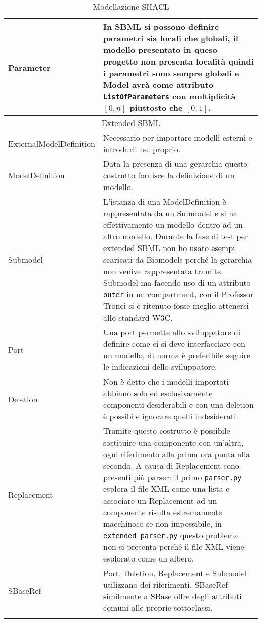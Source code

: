 \documentclass{article}
\begin{document}
\begin{longtable}{p{}p{}}
    \hline
    Parameter & In SBML si possono definire parametri sia locali che globali, il modello presentato in queso progetto non presenta località quindi i parametri sono sempre globali e Model avrà come attributo \texttt{ListOfParameters} con moltiplicità $[0,n]$ piuttosto che $[0,1]$. \\  
    \hline 
    \multicolumn{2}{c}{Extended SBML} \\
    \hline
    ExternalModelDefinition &  Necessario per importare modelli esterni e introdurli nel proprio. \\
    \hline
    ModelDefinition & Data la presenza di una gerarchia questo costrutto fornisce la definizione di un modello. \\ 
    \hline
    Submodel & L'istanza di una ModelDefinition è rappresentata da un Submodel e si ha effettivamente un modello dentro ad un altro modello. Durante la fase di test per extended SBML non ho usato esempi scaricati da Biomodels perché la gerarchia non veniva rappresentata tramite Submodel ma facendo uso di un attributo \texttt{outer} in un compartment, con il Professor Tronci si è ritenuto fosse meglio attenersi allo standard W3C. \\ 
    \hline
    Port & Una port permette allo sviluppatore di definire come ci si deve interfacciare con un modello, di norma è preferibile seguire le indicazioni dello sviluppatore. \\ 
    \hline
    Deletion & Non è detto che i modelli importati abbiano solo ed esclusivamente componenti desiderabili e con una deletion è possibile ignorare quelli indesiderati. \\
    \hline
    Replacement & Tramite questo costrutto è possibile sostituire una componente con un'altra, ogni riferimento alla prima ora punta alla seconda. A causa di Replacement sono presenti più parser: il primo \texttt{parser.py} esplora il file XML come una lista e associare un Replacement ad un componente risulta estremamente macchinoso se non impossibile, in \texttt{extended\_parser.py} questo problema non si presenta perché il file XML viene esplorato come un albero. \\
    \hline
    SBaseRef & Port, Deletion, Replacement e Submodel utilizzano dei riferimenti, SBaseRef similmente a SBase offre degli attributi comuni alle proprie sottoclassi. \\
    \hline

    \caption{Modellazione SHACL}
    \label{tab:modellazione}
\end{longtable}
\end{document}
